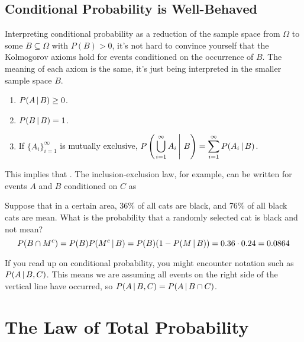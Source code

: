 \subsection*{Conditional Probability is Well-Behaved}

Interpreting conditional probability as a reduction of the sample space from $\Omega$ to some $B \subseteq \Omega$ with $P(B) > 0$, it's not hard to convince yourself that the Kolmogorov axioms hold for events conditioned on the occurrence of $B$. The meaning of each axiom is the same, it's just being interpreted in the smaller sample space $B$.
\begin{enumerate}
\item $P(A \,|\, B) \geq 0$.
\item $P(B \,|\, B) = 1$.
\vspace*{-7pt}
\item If $\{A_i\}_{i=1}^{\infty}$ is mutually exclusive, $P\displaystyle\left(\left. \bigcup_{i=1}^{\infty} A_i \,\right|\, B \right) = \sum_{i=1}^{\infty} P(A_i \,|\, B)$.
\end{enumerate}
\par
This implies that . The inclusion-exclusion law, for example, can be written for events $A$ and $B$ conditioned on $C$ as
\begin{examp}
Suppose that in a certain area, 36\% of all cats are black, and 76\% of all black cats are mean. What is the probability that a randomly selected cat is black and not mean?
$$P(B \cap M^c) = P(B)P(M^c \,|\, B) = P(B)(1-P(M \,|\, B)) = 0.36 \cdot 0.24 = 0.0864$$
\end{examp}
\par
\rmk If you read up on conditional probability, you might encounter notation such as $P(A \,|\, B,C)$. This means we are assuming all events on the right side of the vertical line have occurred, so $P(A \,|\, B,C) = P(A \,|\, B \cap C)$.

\section{The Law of Total Probability}

